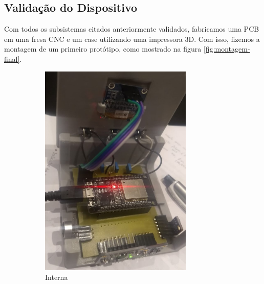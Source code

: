 \documentclass[../monografia.tex]{subfiles}
\begin{document}

\subsection{Validação do Dispositivo} %


Com todos os subsistemas citados anteriormente validados, fabricamos uma PCB em uma fresa CNC e um case utilizando uma impressora 3D. Com isso, fizemos a montagem de um primeiro protótipo, como mostrado na figura \ref{fig:montagem-final}. 

\begin{figure}[h]
	\centering
	\begin{subfigure}{0.5\textwidth}
		\centering
	\includegraphics[width=0.8\textwidth]{placa-final}
	\caption{Interna}
	\label{fig:interna}
	\end{subfigure}%
	\begin{subfigure}{0.5\textwidth}
		\centering

\end{subfigure}
\end{figure}
\end{document}
